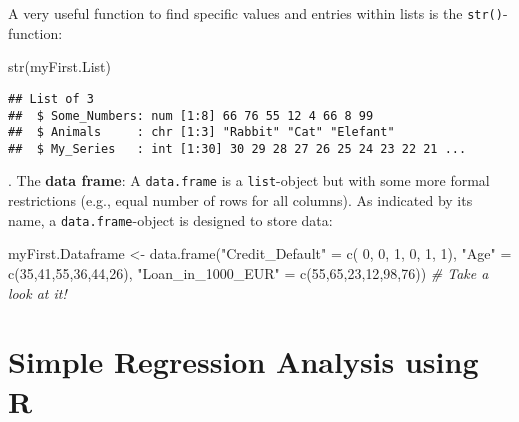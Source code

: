 \documentclass[
]{book}
\newenvironment{Shaded}{\begin{snugshade}}{\end{snugshade}}
\newcommand{\CommentTok}[1]{\textcolor[rgb]{0.56,0.35,0.01}{\textit{#1}}}
\newcommand{\DecValTok}[1]{\textcolor[rgb]{0.00,0.00,0.81}{#1}}
\newcommand{\FunctionTok}[1]{\textcolor[rgb]{0.00,0.00,0.00}{#1}}
\newcommand{\NormalTok}[1]{#1}
\newcommand{\OtherTok}[1]{\textcolor[rgb]{0.56,0.35,0.01}{#1}}
\newcommand{\StringTok}[1]{\textcolor[rgb]{0.31,0.60,0.02}{#1}}
\begin{document}
A very useful function to find specific values and entries within lists is the \texttt{str()}-function:

\begin{Shaded}
\begin{Highlighting}[]
\FunctionTok{str}\NormalTok{(myFirst.List)}
\end{Highlighting}
\end{Shaded}

\begin{verbatim}
## List of 3
##  $ Some_Numbers: num [1:8] 66 76 55 12 4 66 8 99
##  $ Animals     : chr [1:3] "Rabbit" "Cat" "Elefant"
##  $ My_Series   : int [1:30] 30 29 28 27 26 25 24 23 22 21 ...
\end{verbatim}

\hfill\break
\hfill{}. The \textbf{data frame}: A \texttt{data.frame} is a \texttt{list}-object but with some more formal restrictions (e.g., equal number of rows for all columns). As indicated by its name, a \texttt{data.frame}-object is designed to store data:

\begin{Shaded}
\begin{Highlighting}[]
\NormalTok{myFirst.Dataframe }\OtherTok{\textless{}{-}} \FunctionTok{data.frame}\NormalTok{(}\StringTok{"Credit\_Default"}   \OtherTok{=} \FunctionTok{c}\NormalTok{( }\DecValTok{0}\NormalTok{, }\DecValTok{0}\NormalTok{, }\DecValTok{1}\NormalTok{, }\DecValTok{0}\NormalTok{, }\DecValTok{1}\NormalTok{, }\DecValTok{1}\NormalTok{), }
                                \StringTok{"Age"}              \OtherTok{=} \FunctionTok{c}\NormalTok{(}\DecValTok{35}\NormalTok{,}\DecValTok{41}\NormalTok{,}\DecValTok{55}\NormalTok{,}\DecValTok{36}\NormalTok{,}\DecValTok{44}\NormalTok{,}\DecValTok{26}\NormalTok{), }
                                \StringTok{"Loan\_in\_1000\_EUR"} \OtherTok{=} \FunctionTok{c}\NormalTok{(}\DecValTok{55}\NormalTok{,}\DecValTok{65}\NormalTok{,}\DecValTok{23}\NormalTok{,}\DecValTok{12}\NormalTok{,}\DecValTok{98}\NormalTok{,}\DecValTok{76}\NormalTok{)) }
\CommentTok{\# Take a look at it!}
\end{Highlighting}
\end{Shaded}

\hfill\break

\hypertarget{simple-regression-analysis-using-r}{%
\section{Simple Regression Analysis using R}\label{simple-regression-analysis-using-r}}
\end{document}
